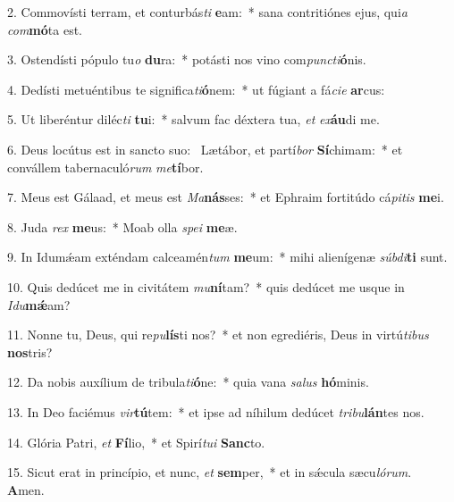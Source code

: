 2. Commovísti terram, et conturbás\textit{ti} \textbf{e}am:~*  sana contritiónes ejus, qui\textit{a} \textit{com}\textbf{mó}ta est.\

3. Ostendísti pópulo tu\textit{o} \textbf{du}ra:~*  potásti nos vino com\textit{punc}\textit{ti}\textbf{ó}nis.\

4. Dedísti metuéntibus te significa\textit{ti}\textbf{ó}nem:~*  ut fúgiant a fá\textit{ci}\textit{e} \textbf{ar}cus:\

5. Ut liberéntur diléc\textit{ti} \textbf{tu}i:~*  salvum fac déxtera tua, \textit{et} \textit{ex}\textbf{áu}di me.\

6. Deus locútus est in sancto suo: \dag\  Lætábor, et partí\textit{bor} \textbf{Sí}chimam:~*  et convállem tabernaculó\textit{rum} \textit{me}\textbf{tí}bor.\

7. Meus est Gálaad, et meus est \textit{Ma}\textbf{nás}ses:~*  et Ephraim fortitúdo cá\textit{pi}\textit{tis} \textbf{me}i.\

8. Juda \textit{rex} \textbf{me}us:~*  Moab olla \textit{spe}\textit{i} \textbf{me}æ.\

9. In Idumǽam exténdam calceamén\textit{tum} \textbf{me}um:~*  mihi alienígenæ \textit{súb}\textit{di}\textbf{ti} sunt.\

10. Quis dedúcet me in civitátem \textit{mu}\textbf{ní}tam?~*  quis dedúcet me usque in \textit{I}\textit{du}\textbf{mǽ}am?\

11. Nonne tu, Deus, qui re\textit{pu}\textbf{lís}ti nos?~*  et non egrediéris, Deus in virtú\textit{ti}\textit{bus} \textbf{nos}tris?\

12. Da nobis auxílium de tribula\textit{ti}\textbf{ó}ne:~*  quia vana \textit{sa}\textit{lus} \textbf{hó}minis.\

13. In Deo faciémus \textit{vir}\textbf{tú}tem:~*  et ipse ad níhilum dedúcet \textit{tri}\textit{bu}\textbf{lán}tes nos.\

14. Glória Patri, \textit{et} \textbf{Fí}lio,~*  et Spirí\textit{tu}\textit{i} \textbf{Sanc}to.\

15. Sicut erat in princípio, et nunc, \textit{et} \textbf{sem}per,~*  et in sǽcula sæcu\textit{ló}\textit{rum}. \textbf{A}men.\

